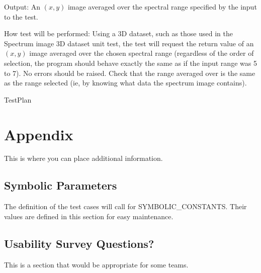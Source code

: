 \documentclass[12pt, titlepage]{article}
\begin{document}
\begin{enumerate}
Output: An $(x,y)$ image averaged over the spectral range specified by the input to the test.

How test will be performed: Using a 3D dataset, such as those used in the Spectrum image 3D dataset unit test, the test will request the return value of an $(x,y)$ image averaged over the chosen spectral range (regardless of the order of selection, the program should behave exactly the same as if the input range was 5 to 7). No errors should be raised. Check that the range averaged over is the same as the range selected (ie, by knowing what data the spectrum image contains).

\end{enumerate}

 {TestPlan}

\newpage

\section{Appendix}

This is where you can place additional information.

\subsection{Symbolic Parameters}

The definition of the test cases will call for SYMBOLIC\_CONSTANTS.
Their values are defined in this section for easy maintenance.

\subsection{Usability Survey Questions?}

This is a section that would be appropriate for some teams.
\end{document}
